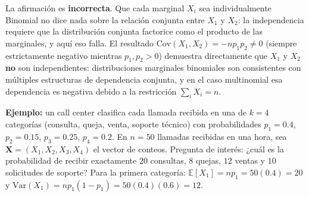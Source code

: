 \begin{solproblema}[prob:81748ff]
	La afirmación es \textbf{incorrecta}. Que cada marginal $X_i$ sea individualmente Binomial no dice nada sobre la relación conjunta entre $X_1$ y $X_2$: la independencia requiere que la distribución conjunta factorice como el producto de las marginales, y aquí eso falla. El resultado $\text{Cov}(X_1,X_2)=-np_1p_2 \neq 0$ (siempre estrictamente negativo mientras $p_1,p_2>0$) demuestra directamente que $X_1$ y $X_2$ \textbf{no} son independientes: distribuciones marginales binomiales son consistentes con múltiples estructuras de dependencia conjunta, y en el caso multinomial esa dependencia es negativa debido a la restricción $\sum_i X_i=n$.
\end{solproblema}

\begin{solproblema}[prob:858a3a8]
	\textbf{Ejemplo:} un call center clasifica cada llamada recibida en una de $k=4$ categorías (consulta, queja, venta, soporte técnico) con probabilidades $p_1=0.4$, $p_2=0.15$, $p_3=0.25$, $p_4=0.2$. En $n=50$ llamadas recibidas en una hora, sea $\bm{X}=(X_1,X_2,X_3,X_4)$ el vector de conteos. Pregunta de interés: ¿cuál es la probabilidad de recibir exactamente $20$ consultas, $8$ quejas, $12$ ventas y $10$ solicitudes de soporte? Para la primera categoría: $\mathbb{E}[X_1] = np_1 = 50(0.4) = 20$ y $\text{Var}(X_1) = np_1(1-p_1) = 50(0.4)(0.6) = 12$.
\end{solproblema}
